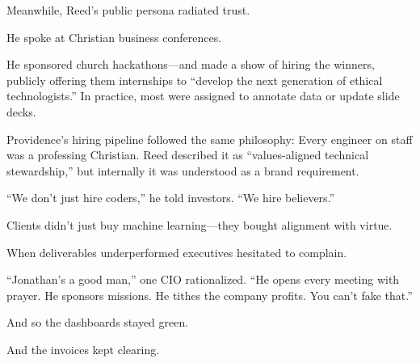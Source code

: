 \medskip

Meanwhile, Reed’s public persona radiated trust.

He spoke at Christian business conferences.

He sponsored church hackathons—and made a show of hiring the winners, publicly offering them internships to “develop the next generation of ethical technologists.”  
In practice, most were assigned to annotate data or update slide decks.

Providence’s hiring pipeline followed the same philosophy:  
Every engineer on staff was a professing Christian. Reed described it as “values-aligned technical stewardship,” but internally it was understood as a brand requirement.

“We don’t just hire coders,” he told investors.  
“We hire believers.”

Clients didn’t just buy machine learning—they bought alignment with virtue.

When deliverables underperformed executives hesitated to complain.

“Jonathan’s a good man,” one CIO rationalized.  
“He opens every meeting with prayer.  
He sponsors missions.  
He tithes the company profits.  
You can’t fake that.”

And so the dashboards stayed green.

And the invoices kept clearing.




